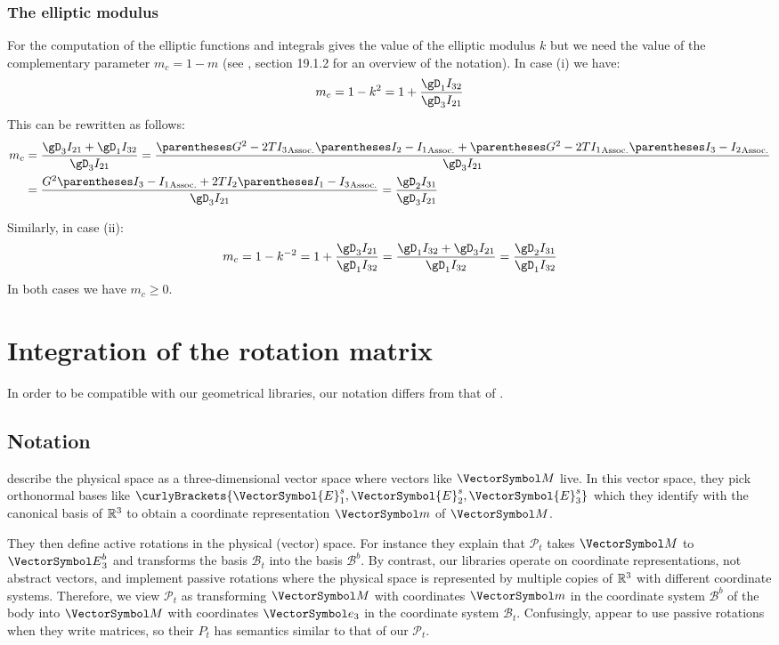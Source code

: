 \documentclass[10pt, a4paper, twoside]{basestyle}
\begin{document}
\subsubsection*{The elliptic modulus}
For the computation of the elliptic functions and integrals \cite{Celledoni2007} gives the value of the elliptic modulus $k$ but we need the value of
the complementary parameter $m_c = 1 - m$ (see \cite{NistHMF2010}, section 19.1.2 for an overview of the notation).  In case (i) we have:
\[
m_c = 1 - k^2 = 1 + \frac{\gD_1 I_{32}}{\gD_3 I_{21}}
\]
This can be rewritten as follows:
\begin{align*}
m_c &= \frac{\gD_3 I_{21} + \gD_1 I_{32}}{\gD_3 I_{21}}
=\frac{\pa{G^2 - 2 T I_3}\pa{I_2 - I_1} + \pa{G^2 - 2 T I_1}\pa{I_3 - I_2}}{\gD_3 I_{21}} \\
&=\frac{G^2\pa{I_3 - I_1} + 2 T I_2\pa{I_1 - I_3}}{\gD_3 I_{21}}
=\frac{\gD_2 I_{31}}{\gD_3 I_{21}}
\end{align*}

Similarly, in case (ii):
\[
m_c = 1 - k^{-2} = 1 + \frac{\gD_3 I_{21}}{\gD_1 I_{32}}
=\frac{\gD_1 I_{32} + \gD_3 I_{21}}{\gD_1 I_{32}}
=\frac{\gD_2 I_{31}}{\gD_1 I_{32}}
\]
In both cases we have $m_c \geq 0$.

\section*{Integration of the rotation matrix}
In order to be compatible with our geometrical libraries, our notation differs from that of \cite{Celledoni2007}.
\subsection*{Notation}
\cite{Celledoni2007} describe the physical space as a three-dimensional vector space where vectors like $\VectorSymbol M$ live.  In this vector space,
they pick orthonormal bases like $\curlyBrackets{\VectorSymbol{E}^s_1, \VectorSymbol{E}^s_2, \VectorSymbol{E}^s_3}$ which they identify with the
canonical basis of $\mathbb{R}^3$ to obtain a coordinate representation $\vm$ of $\VectorSymbol M$.

They then define active rotations in the physical (vector) space.  For instance they explain that $\mathscr P_t$ takes $\VectorSymbol M$ to ${\VectorSymbol E}_3^b$ and transforms the basis $\mathscr B_t$ into the basis $\mathscr B^b$.  By contrast, our libraries operate on coordinate
representations, not abstract vectors, and implement passive rotations where the physical space is represented by multiple copies of $\mathbb{R}^3$ with
different coordinate systems.  Therefore, we view $\mathscr P_t$ as transforming $\VectorSymbol M$ with coordinates $\vm$ in the coordinate system 
$\mathscr B^b$ of the body into $\VectorSymbol M$ with coordinates $\ve_3$ in the coordinate system $\mathscr B_t$.  Confusingly, 
\cite{Celledoni2007} appear to use passive rotations when they write matrices, so their $P_t$ has semantics similar to that of our $\mathscr P_t$.
\end{document}
